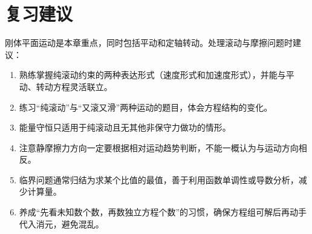 \documentclass[11pt,a4paper]{ctexart}
\begin{document}
\section*{复习建议}
刚体平面运动是本章重点，同时包括平动和定轴转动。处理滚动与摩擦问题时建议：
\begin{enumerate}
  \item 熟练掌握纯滚动约束的两种表达形式（速度形式和加速度形式），并能与平动、转动方程灵活联立。
  \item 练习“纯滚动”与“又滚又滑”两种运动的题目，体会方程结构的变化。
  \item 能量守恒只适用于纯滚动且无其他非保守力做功的情形。
  \item 注意静摩擦力方向一定要根据相对运动趋势判断，不能一概认为与运动方向相反。
  \item 临界问题通常归结为求某个比值的最值，善于利用函数单调性或导数分析，减少计算量。
  \item 养成“先看未知数个数，再数独立方程个数”的习惯，确保方程组可解后再动手代入消元，避免混乱。
\end{enumerate}
\end{document}
